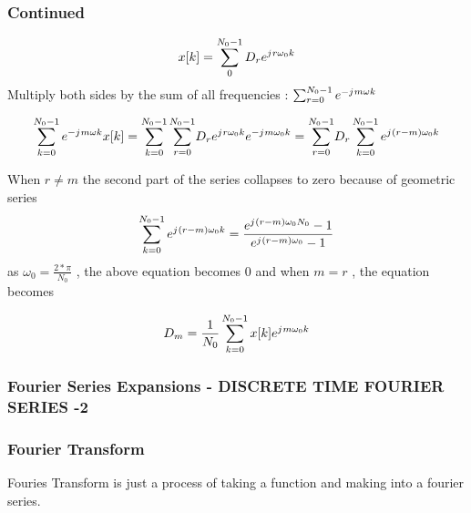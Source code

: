 \documentclass[10pt]{beamer}
\newcommand{\ju}{{j\mkern1mu}}
\begin{document}
\begin{frame}
	\frametitle{Continued}
$$x[k] = \sum_{0}^{N_0 -1}{D_r e^ {\ju r\omega_0 k}}$$
Multiply both sides by the sum of all frequencies : $\sum_{r=0}^{N_0-1}e^{-\ju m \omega k}$

$$\sum_{k=0}^{N_0-1}{e^{-\ju m \omega k} x[k]} = {\sum_{k=0}^{N_0-1} {\sum_{r=0}^{N_0 -1}}{D_r e^ {\ju r\omega_0 k} {e^ {-\ju m\omega_0 k}}}} =  {\sum_{r=0}^{N_0-1}}{ {D_r}\sum_{k=0}^{N_0 -1} { e^ {\ju {(r-m)}\omega_0 k}}} $$ 

When $r \ne m $ the second part of the series collapses to zero because of geometric series
$$\sum_{k=0}^{N_0 -1} { e^ {\ju {(r-m)}\omega_0 k}} = {\frac{e^{\ju(r-m)\omega_0N_0}-1 }{e^{\ju(r-m)\omega_0}-1 } }  $$  
as $\omega_0 = \frac{2*\pi}{N_0}$ , the above equation becomes 0 and when  $m = r$ , the equation becomes

$$D_m = \frac{1}{N_0} \sum_{k=0}^{N_0 -1} x[k] {e^{\ju m\omega_0k}}$$


	

\end{frame}

\begin{frame}
	\frametitle{Fourier Series Expansions - DISCRETE TIME FOURIER SERIES -2 }
	
	
	
\end{frame}


\begin{frame}
	\frametitle{Fourier Transform}
	
	Fouries Transform is just a process of taking a function and making into a fourier series.  
\end{frame}
\end{document}
